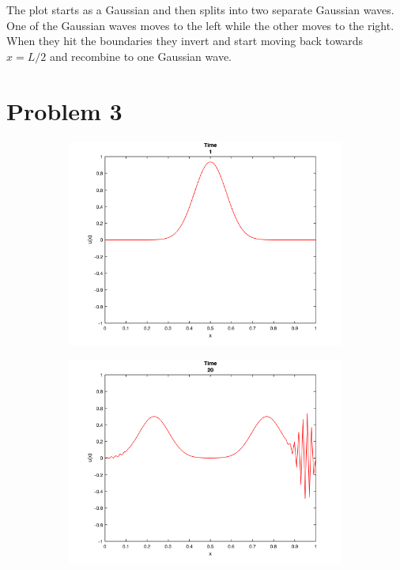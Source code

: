 \documentclass[12pt]{article}
\begin{document}
The plot starts as a Gaussian and then splits into two separate Gaussian waves. One of the Gaussian waves moves to the left while the other moves to the right. When they hit the boundaries they invert and start moving back towards $x = L/2$ and recombine to one Gaussian wave.

\clearpage

\section*{Problem 3}

\begin{figure}[h!]
\centering

\begin{subfigure}{0.49\columnwidth}
\centering
\includegraphics[width=\textwidth]{problem_3_t_1.png}
\caption{}
\label{fig:time1}
\end{subfigure}\hfill
\begin{subfigure}{0.49\columnwidth}
\centering
\includegraphics[width=\textwidth]{problem_3_t_20.png}
\caption{}
\label{fig:time2}
\end{subfigure}


\end{figure}
\end{document}
